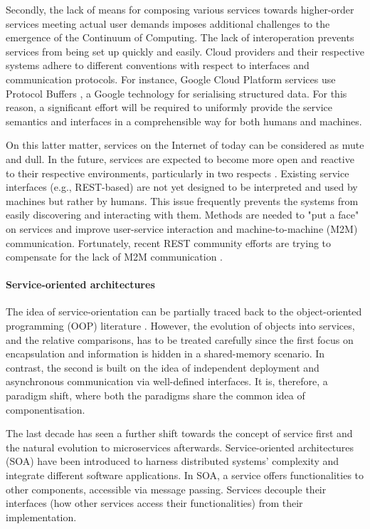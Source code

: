 \documentclass{ieeeaccess}
\begin{document}
Secondly, the lack of means for composing various services towards higher-order services meeting actual user demands imposes additional challenges to the emergence of the Continuum of Computing. The lack of interoperation prevents services from being set up quickly and easily. Cloud providers and their respective systems adhere to different conventions with respect to interfaces and communication protocols. For instance, Google Cloud Platform services use Protocol Buffers \cite{protobuf}, a Google technology for serialising structured data. For this reason, a significant effort will be required to uniformly provide the service semantics and interfaces in a comprehensible way for both humans and machines.

On this latter matter, services on the Internet of today can be considered as mute and dull. In the future, services are expected to become more open and reactive to their respective environments, particularly in two respects \cite{iot-enterprise}. Existing service interfaces (e.g., REST-based) are not yet designed to be interpreted and used by machines but rather by humans. This issue frequently prevents the systems from easily discovering and interacting with them. Methods are needed to "put a face" on services and improve user-service interaction and machine-to-machine (M2M) communication. Fortunately, recent REST community efforts are trying to compensate for the lack of M2M communication \cite{openapi}.

\paragraph{Service-oriented architectures}

The idea of service-orientation can be partially traced back to the object-oriented programming (OOP) literature \cite{microservices-today}. However, the evolution of objects into services, and the relative comparisons, has to be treated carefully since the first focus on encapsulation and information is hidden in a shared-memory scenario. In contrast, the second is built on the idea of independent deployment and asynchronous communication via well-defined interfaces. It is, therefore, a paradigm shift, where both the paradigms share the common idea of componentisation.

The last decade has seen a further shift towards the concept of service first and the natural evolution to microservices afterwards. Service-oriented architectures (SOA) have been introduced to harness distributed systems' complexity and integrate different software applications. In SOA, a service offers functionalities to other components, accessible via message passing. Services decouple their interfaces (how other services access their functionalities) from their implementation.
\end{document}
